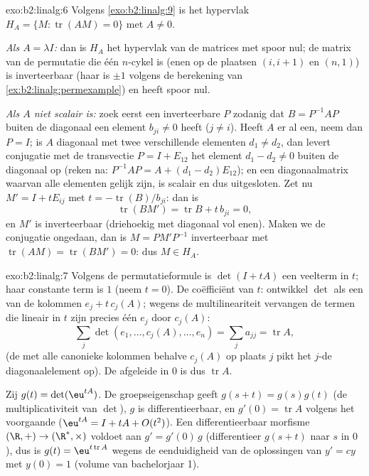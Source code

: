 \begin{solution}{exo:b2:linalg:6}
Volgens \cref{exo:b2:linalg:9} is het hypervlak $H_A = \{M :
\operatorname{tr}(AM) = 0\}$ met $A \neq 0$.

\emph{Als $A = \lambda I$:} dan is $H_A$ het hypervlak van de
matrices met spoor nul; de matrix van de permutatie die één
$n$-cykel is (enen op de plaatsen $(i, i+1)$ en $(n, 1)$) is
inverteerbaar (haar  is $\pm 1$ volgens de berekening
van \cref{ex:b2:linalg:permexample}) en heeft spoor nul.

\emph{Als $A$ niet scalair is:} zoek eerst een inverteerbare $P$
zodanig dat $B = P^{-1}AP$ buiten de diagonaal een element $b_{ji}
\neq 0$ heeft ($j \neq i$). Heeft $A$ er al een, neem dan $P = I$;
is $A$ diagonaal met twee verschillende elementen $d_1 \neq d_2$,
dan levert conjugatie met de transvectie $P = I + E_{12}$ het
element $d_1 - d_2 \neq 0$ buiten de diagonaal op (reken na:
$P^{-1}AP = A + (d_1 - d_2)E_{12}$); en een diagonaalmatrix waarvan
alle elementen gelijk zijn, is scalair en dus uitgesloten. Zet nu
$M' = I + tE_{ij}$ met $t = -\operatorname{tr}(B)/b_{ji}$: dan is
\[
\operatorname{tr}(BM') = \operatorname{tr} B + t\,b_{ji} = 0,
\]
en $M'$ is inverteerbaar (driehoekig met diagonaal vol enen).
Maken we de conjugatie ongedaan, dan is $M = PM'P^{-1}$
inverteerbaar met $\operatorname{tr}(AM) = \operatorname{tr}(BM')
= 0$: dus $M \in H_A$.
\end{solution}

\begin{solution}{exo:b2:linalg:7}
Volgens de permutatieformule is $\det(I + tA)$ een veelterm in $t$;
haar constante term is $1$ (neem $t = 0$). De coëfficiënt van $t$:
ontwikkel $\det$ als een  van de kolommen $e_j +
t\,c_j(A)$; wegens de multilineariteit vervangen de termen die
lineair in $t$ zijn precies één $e_j$ door $c_j(A)$:
\[
\sum_{j} \det(e_1, \dots, c_j(A), \dots, e_n)
= \sum_j a_{jj} = \operatorname{tr} A ,
\]
(de  met alle canonieke kolommen behalve $c_j(A)$ op
plaats $j$ pikt het $j$-de diagonaalelement op). De afgeleide in
$0$ is dus $\operatorname{tr} A$.

Zij $g(t) = \det(\eu^{tA})$. De groepseigenschap geeft $g(s + t) =
g(s)g(t)$ (de multiplicativiteit van $\det$), $g$ is
differentieerbaar, en $g'(0) = \operatorname{tr} A$ volgens het
voorgaande ($\eu^{tA} = I + tA + O(t^2)$). Een differentieerbaar
morfisme $(\R, +) \to (\R^*, \times)$ voldoet aan $g' = g'(0)\,g$
(differentieer $g(s+t)$ naar $s$ in $0$), dus is $g(t) =
\eu^{t\operatorname{tr} A}$ wegens de eenduidigheid van de
oplossingen van $y' = cy$ met $y(0) = 1$ (volume van bachelorjaar
1).
\end{solution}

